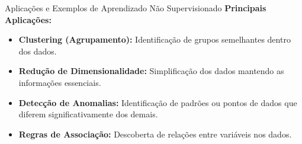 \documentclass{beamer}
\begin{document}
\begin{frame}{Aplicações e Exemplos de Aprendizado Não Supervisionado}
    \textbf{Principais Aplicações:}
    \begin{itemize}
        \item \textbf{Clustering (Agrupamento):} Identificação de grupos semelhantes dentro dos dados.
        \item \textbf{Redução de Dimensionalidade:} Simplificação dos dados mantendo as informações essenciais.
        \item \textbf{Detecção de Anomalias:} Identificação de padrões ou pontos de dados que diferem significativamente dos demais.
        \item \textbf{Regras de Associação:} Descoberta de relações entre variáveis nos dados.
    \end{itemize}
    
    
\end{frame}
\end{document}
